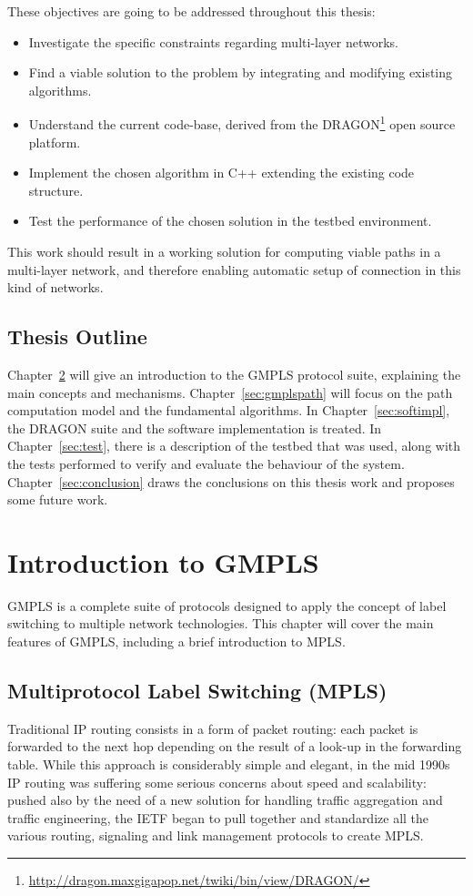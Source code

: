\documentclass[10pt,a4paper]{report}
\begin{document}
These objectives are going to be addressed throughout this thesis:
\begin{itemize}
\item Investigate the specific constraints regarding multi-layer
  networks.
\item Find a viable solution to the problem by integrating and
  modifying existing algorithms.
\item Understand the current code-base, derived from the
  DRAGON\footnote{\url{http://dragon.maxgigapop.net/twiki/bin/view/DRAGON/}}
  open source platform.
\item Implement the chosen algorithm in C++ extending the existing
  code structure.
\item Test the performance of the chosen solution in the testbed
  environment.
\end{itemize}

This work should result in a working solution for computing viable
paths in a multi-layer network, and therefore enabling automatic setup
of connection in this kind of networks.

\section{Thesis Outline}

Chapter~\ref{sec:introgmpls} will give an introduction to the GMPLS
protocol suite, explaining the main concepts and
mechanisms. Chapter~\ref{sec:gmplspath} will focus on the path
computation model and the fundamental algorithms. In
Chapter~\ref{sec:softimpl}, the DRAGON suite and the software
implementation is treated. In Chapter~\ref{sec:test}, there is a
description of the testbed that was used, along with the tests
performed to verify and evaluate the behaviour of the
system. Chapter~\ref{sec:conclusion} draws the conclusions on this
thesis work and proposes some future work.

\clearpage
\mbox{}
\clearpage

\chapter{Introduction to GMPLS}\label{sec:introgmpls}
GMPLS is a complete suite of protocols designed to apply the concept
of label switching to multiple network technologies. This chapter will
cover the main features of GMPLS, including a brief introduction to
MPLS.

\section{Multiprotocol Label Switching (MPLS)}
Traditional IP routing consists in a form of packet routing: each
packet is forwarded to the next hop depending on the result of a
look-up in the forwarding table. While this approach is considerably
simple and elegant, in the mid 1990s IP routing was suffering some
serious concerns about speed and scalability: pushed also by the need
of a new solution for handling traffic aggregation and traffic
engineering, the IETF began to pull together and standardize all the
various routing, signaling and link management protocols to create
MPLS.
\end{document}
